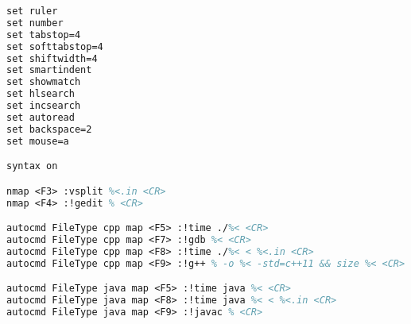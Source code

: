 \begin{lstlisting}[language=tex,identifierstyle=\color{black},commentstyle=\color{black}]
set ruler
set number
set tabstop=4
set softtabstop=4
set shiftwidth=4
set smartindent
set showmatch
set hlsearch
set incsearch
set autoread
set backspace=2
set mouse=a

syntax on

nmap <F3> :vsplit %<.in <CR>
nmap <F4> :!gedit % <CR>

autocmd FileType cpp map <F5> :!time ./%< <CR>
autocmd FileType cpp map <F7> :!gdb %< <CR>
autocmd FileType cpp map <F8> :!time ./%< < %<.in <CR>
autocmd FileType cpp map <F9> :!g++ % -o %< -std=c++11 && size %< <CR>

autocmd FileType java map <F5> :!time java %< <CR>
autocmd FileType java map <F8> :!time java %< < %<.in <CR>
autocmd FileType java map <F9> :!javac % <CR>
\end{lstlisting}

